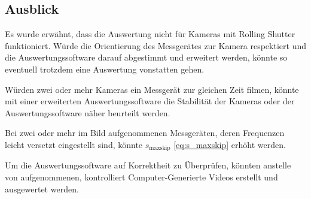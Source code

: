 \subsection{Ausblick}

Es wurde erwähnt, dass die Auswertung nicht für Kameras mit Rolling Shutter funktioniert.
Würde die Orientierung des Messgerätes zur Kamera respektiert und die Auswertungssoftware darauf abgestimmt und erweitert werden,
könnte so eventuell trotzdem eine Auswertung vonstatten gehen.

Würden zwei oder mehr Kameras ein Messgerät zur gleichen Zeit filmen, könnte mit einer erweiterten Auswertungssoftware
die Stabilität der Kameras oder der Auswertungssoftware näher beurteilt werden.

Bei zwei oder mehr im Bild aufgenommenen Messgeräten,
deren Frequenzen leicht versetzt eingestellt sind, könnte
$s_\text{maxskip}$ \eqref{eq:s_maxskip} erhöht werden.

Um die Auswertungssoftware auf Korrektheit zu Überprüfen, könnten anstelle von aufgenommenen, kontrolliert Computer-Generierte Videos erstellt 
und ausgewertet werden.

